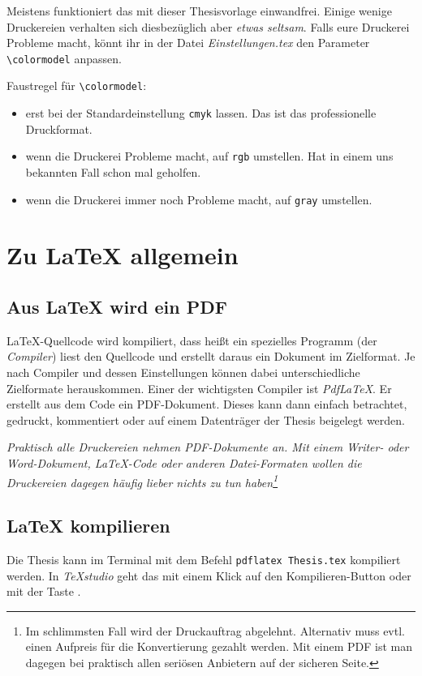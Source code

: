 			Meistens funktioniert das mit dieser Thesisvorlage einwandfrei.
			Einige wenige Druckereien verhalten sich diesbezüglich aber \emph{etwas seltsam}.
			Falls eure Druckerei Probleme macht, könnt ihr in der Datei \emph{Einstellungen.tex} den Parameter \lstinline|\colormodel| anpassen.
			
			Faustregel für \lstinline|\colormodel|:
			\begin{itemize}
			\item erst bei der Standardeinstellung \lstinline|cmyk| lassen. Das ist das professionelle Druckformat.
			\item wenn die Druckerei Probleme macht, auf \lstinline|rgb| umstellen. Hat in einem uns bekannten Fall schon mal geholfen.
			\item wenn die Druckerei immer noch Probleme macht, auf \lstinline|gray| umstellen.
			\end{itemize}

	\clearpage
	\section{Zu \LaTeX{} allgemein}\label{FAQ:LaTeX}
		\subsection{Aus \LaTeX{} wird ein PDF}
			\LaTeX-Quellcode wird kompiliert, dass heißt ein spezielles Programm (der \emph{Compiler}) liest den Quellcode und erstellt daraus ein Dokument im Zielformat.
			Je nach Compiler und dessen Einstellungen können dabei unterschiedliche Zielformate herauskommen.
%			
			Einer der wichtigsten Compiler ist \emph{Pdf\LaTeX}. Er erstellt aus dem Code ein PDF-Dokument. Dieses kann dann einfach betrachtet, gedruckt, kommentiert oder auf einem Datenträger der Thesis beigelegt werden.
			
			\emph{Praktisch alle Druckereien nehmen PDF-Dokumente an.
			Mit einem Writer- oder Word-Dokument, LaTeX-Code oder anderen Datei-Formaten wollen die Druckereien dagegen häufig lieber nichts zu tun haben\footnote{Im schlimmsten Fall wird der Druckauftrag abgelehnt. Alternativ muss evtl. einen Aufpreis für die Konvertierung gezahlt werden. Mit einem PDF ist man dagegen bei praktisch allen seriösen Anbietern auf der sicheren Seite.}}
			
		\subsection{\LaTeX{} kompilieren}
			Die Thesis kann im Terminal mit dem Befehl \lstinline|pdflatex Thesis.tex| kompiliert werden.
			In \emph{TeXstudio} geht das mit einem Klick auf den Kompilieren-Button oder mit der Taste .
			
